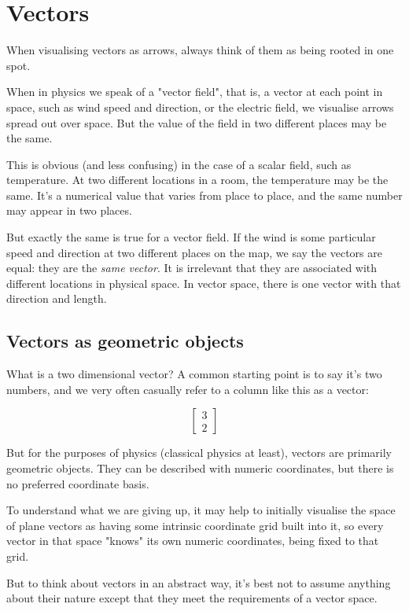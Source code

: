 \chapter{Vectors}\label{ch:vectors}

When visualising vectors as arrows, always think of them as being rooted in one spot.

When in physics we speak of a "vector field", that is, a vector at each point in space, such as wind speed and direction, or the electric field, we visualise arrows spread out over space. But the value of the field in two different places may be the same.

This is obvious (and less confusing) in the case of a scalar field, such as temperature. At two different locations in a room, the temperature may be the same. It's a numerical value that varies from place to place, and the same number may appear in two places.

But exactly the same is true for a vector field. If the wind is some particular speed and direction at two different places on the map, we say the vectors are equal: they are the \textit{same vector}. It is irrelevant that they are associated with different locations in physical space. In vector space, there is one vector with that direction and length.

\section{Vectors as geometric objects}\label{sec:vectors-geometric}

What is a two dimensional vector? A common starting point is to say it's two numbers, and we very often casually refer to a column like this as a vector:

$$
\begin{bmatrix}3 \\ 2\end{bmatrix}
$$

But for the purposes of physics (classical physics at least), vectors are primarily geometric objects. They can be described with numeric coordinates, but there is no preferred coordinate basis.

To understand what we are giving up, it may help to initially visualise the space of plane vectors as having some intrinsic coordinate grid built into it, so every vector in that space "knows" its own numeric coordinates, being fixed to that grid.

But to think about vectors in an abstract way, it's best not to assume anything about their nature except that they meet the requirements of a vector space.

